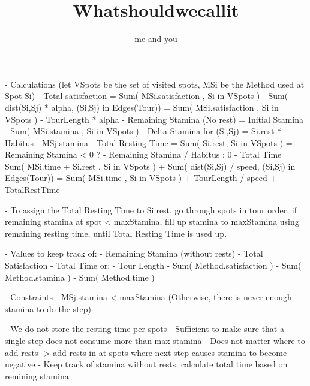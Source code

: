 
\title{Whatshouldwecallit}

\author{me and you}



- Calculations (let VSpots be the set of visited spots, MSi be the Method used at Spot Si)
    - Total satisfaction = Sum( MSi.satisfaction , Si in VSpots ) - Sum( dist(Si,Sj) * alpha, (Si,Sj) in Edges(Tour)) 
                         = Sum( MSi.satisfaction , Si in VSpots ) - TourLength * alpha
    - Remaining Stamina (No rest) = Initial Stamina - Sum( MSi.stamina , Si in VSpots )
    - Delta Stamina for (Si,Sj) = Si.rest * Habitus - MSj.stamina
    - Total Resting Time = Sum( Si.rest, Si in VSpots ) = Remaining Stamina < 0 ? - Remaining Stamina / Habitus : 0
    - Total Time = Sum( MSi.time + Si.rest , Si in VSpots ) + Sum( dist(Si,Sj) / speed, (Si,Sj) in Edges(Tour))
                 = Sum( MSi.time , Si in VSpots ) + TourLength / speed + TotalRestTime

- To assign the Total Resting Time to Si.rest, go through spots in tour order, if remaining stamina at spot < maxStamina, fill up stamina to maxStamina using
remaining resting time, until Total Resting Time is used up.

- Values to keep track of:
    - Remaining Stamina (without rests)
    - Total Satisfaction
    - Total Time
or:
    - Tour Length
    - Sum( Method.satisfaction )
    - Sum( Method.stamina )
    - Sum( Method.time )

- Constraints
    - MSj.stamina < maxStamina (Otherwise, there is never enough stamina to do the step)

- We do not store the resting time per spots
    - Sufficient to make sure that a single step does not consume more than max-stamina
    - Does not matter where to add rests -> add rests in at spots where next step causes stamina to become negative
    - Keep track of stamina without rests, calculate total time based on remining stamina




